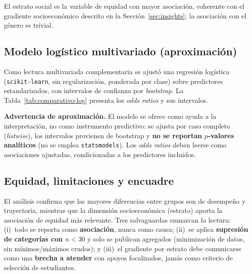 \documentclass[12pt,a4paper]{article}
\begin{document}
\begin{table}[H]
\centering
\caption{Asociación de variables categóricas con la participación.}
\label{tab:comparativo-cat}
\small

\end{table}

El estrato social es la variable de equidad con mayor asociación, coherente con el
gradiente socioeconómico descrito en la Sección~\ref{sec:insights}; la asociación
con el género es trivial.

\subsection{Modelo logístico multivariado (aproximación)}
Como lectura multivariada complementaria se ajustó una regresión logística
(\texttt{scikit-learn}, sin regularización, ponderada por clase) sobre predictores
estandarizados, con intervalos de confianza por \emph{bootstrap}. La
Tabla~\ref{tab:comparativo-log} presenta los \emph{odds ratios} y sus intervalos.

\begin{table}[H]
\centering
\caption{Odds ratios del modelo logístico multivariado (predictores
estandarizados). Intervalos de confianza al 95\% por bootstrap.}
\label{tab:comparativo-log}
\small

\end{table}

\textbf{Advertencia de aproximación.} El modelo se ofrece como ayuda a la
interpretación, no como instrumento predictivo: se ajusta por caso completo
(\emph{listwise}), los intervalos provienen de bootstrap y \textbf{no se reportan
$p$-valores analíticos} (no se emplea \texttt{statsmodels}). Los \emph{odds ratios}
deben leerse como asociaciones ajustadas, condicionadas a los predictores
incluidos.

\subsection{Equidad, limitaciones y encuadre}
El análisis confirma que las mayores diferencias entre grupos son de desempeño y
trayectoria, mientras que la dimensión socioeconómica (estrato) aporta la
asociación de equidad más relevante. Tres salvaguardas enmarcan la lectura:
(i)~todo se reporta como \textbf{asociación}, nunca como causa; (ii)~se aplica
\textbf{supresión de categorías con $n < 30$} y solo se publican agregados
(minimización de datos, sin mínimos/máximos crudos); y (iii)~el gradiente por
estrato debe comunicarse como una \textbf{brecha a atender} con apoyos focalizados,
jamás como criterio de selección de estudiantes.
\end{document}

